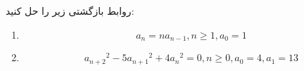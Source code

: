 \EXERCISE
روابط بازگشتی زیر را حل کنید:
\begin{enumerate}
\item
$$a_n = na_{n-1}, n \geq 1, a_0 = 1$$
\item
$${a_{n+2}}^2 - 5{a_{n+1}}^2 + 4{a_n}^2 = 0, n \geq 0, a_0 = 4, a_1 = 13$$
\end{enumerate}